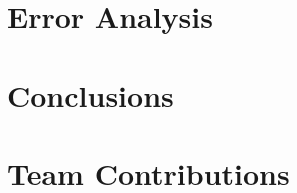 \documentclass[11pt]{article}
\begin{document}
\section{Error Analysis}







\section{Conclusions}









\nocite{*}


\section*{Team Contributions}








\end{document}
